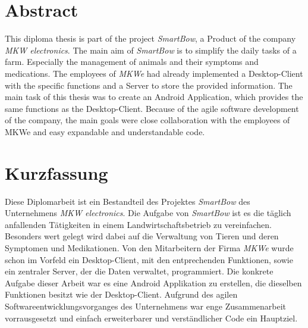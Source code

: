 
{}

\section*{Abstract}
This diploma thesis is part of the project \textit{SmartBow}, a Product of the company \textit{MKW electronics}. The main aim of \textit{SmartBow} is to simplify the daily tasks of a farm. Especially the management of animals and their symptoms and medications. The employees of \textit{MKWe} had already implemented a Desktop-Client with the specific functions and a Server to store the provided information. The main task of this thesis was to create an Android Application, which provides the same functions as the Desktop-Client. Because of the agile software development of the company, the main goals were close collaboration with the employees of MKWe and easy expandable and understandable code.


\section*{Kurzfassung}
Diese Diplomarbeit ist ein Bestandteil des Projektes \textit{SmartBow} des Unternehmens \textit{MKW electronics}. Die Aufgabe von \textit{SmartBow} ist es die täglich anfallenden Tätigkeiten in einem Landwirtschaftsbetrieb zu vereinfachen. Besonders wert gelegt wird dabei auf die Verwaltung von Tieren und deren Symptomen und Medikationen. Von den Mitarbeitern der Firma \textit{MKWe} wurde schon im Vorfeld ein Desktop-Client, mit den entprechenden Funktionen, sowie ein zentraler Server, der die Daten verwaltet, programmiert. Die konkrete Aufgabe dieser Arbeit war es eine Android Applikation zu erstellen, die dieselben Funktionen besitzt wie der Desktop-Client. Aufgrund des agilen Softwareentwicklungsvorganges des Unternehmens war enge Zusammenarbeit vorrausgesetzt und einfach erweiterbarer und verständlicher Code ein Hauptziel.


%
%